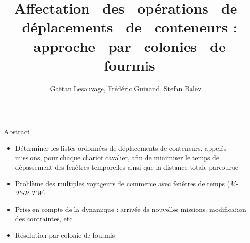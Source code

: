 \documentclass[table]{beamer}
\title{Affectation \ des \ opérations \ de \ déplacements \ de \ conteneurs : \ approche \ par \ colonies \ de \ fourmis}
\author[Lesauvage et al.]{Gaëtan Lesauvage, Frédéric Guinand, Stefan Balev}
\institute[LITIS]{Université du Havre}
\newcommand{\exemple}[1]{\textcolor{vertL!92!black}{#1}} %
\begin{document}
\begin{frame}{} 
\footnotesize
  \begin{columns}
    \begin{column}{0.80\linewidth}
      \begin{block}{Abstract}
	
	\begin{itemize} 
	  \item Déterminer les listes ordonnées de déplacements de conteneurs, appelés \exemple{missions}, pour chaque \exemple{chariot cavalier}, afin de minimiser le temps de dépassement des fenêtres temporelles ainsi que la distance totale parcourue
	  \item Problème des \alert{multiples} voyageurs de commerce avec fenêtres de temps (\textit{M-TSP-TW})
	  \item Prise en compte de la \exemple{dynamique} : arrivée de nouvelles missions, modification des contraintes, etc
	  \item Résolution par \textcolor{vertL}{colonie de fourmis}
        \end{itemize}
      \end{block}
    \end{column}
  \end{columns}


\end{frame}
\end{document}
